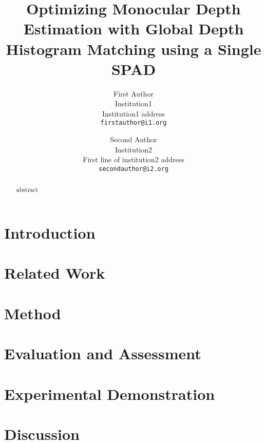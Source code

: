 \documentclass[10pt,twocolumn,letterpaper]{article}
\begin{document}
\title{Optimizing Monocular Depth Estimation with Global Depth Histogram Matching using a Single SPAD}

\author{First Author\\
Institution1\\
Institution1 address\\
{\tt\small firstauthor@i1.org}
\and
Second Author\\
Institution2\\
First line of institution2 address\\
{\tt\small secondauthor@i2.org}
}

\maketitle

\begin{abstract}
abstract
\end{abstract}


\section{Introduction}
\label{sec:intro}


\section{Related Work}
\label{sec:related}


\section{Method}
\label{sec:method}


\section{Evaluation and Assessment}
\label{sec:evaluation}


\section{Experimental Demonstration}
\label{sec:prototype}


\section{Discussion}
\label{sec:discussion}




{\small


}
\end{document}
